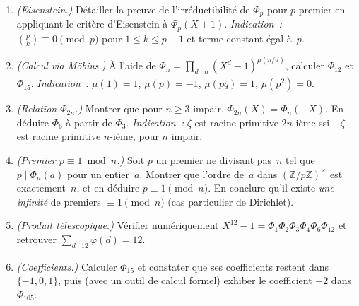 \begin{mdframed}[style=exobar]
  \begin{enumerate}
    \item \textit{(Eisenstein.)} Détailler la preuve de l'irréductibilité de
          $\Phi_p$ pour $p$ premier en appliquant le critère d'Eisenstein à
          $\Phi_p(X+1)$. \textit{Indication~:} $\binom{p}{k}\equiv 0\pmod p$
          pour $1\leq k\leq p-1$ et terme constant égal à~$p$.

    \item \textit{(Calcul via Möbius.)} À l'aide de
          $\Phi_n=\prod_{d\mid n}(X^d-1)^{\mu(n/d)}$, calculer $\Phi_{12}$ et
          $\Phi_{15}$. \textit{Indication~:} $\mu(1)=1$, $\mu(p)=-1$,
          $\mu(pq)=1$, $\mu(p^2)=0$.

    \item \textit{(Relation $\Phi_{2n}$.)} Montrer que pour $n\geq 3$ impair,
          $\Phi_{2n}(X)=\Phi_n(-X)$. En déduire $\Phi_6$ à partir de $\Phi_3$.
          \textit{Indication~:} $\zeta$ est racine primitive $2n$-ième ssi
          $-\zeta$ est racine primitive $n$-ième, pour $n$ impair.

    \item \textit{(Premier $p\equiv 1\bmod n$.)} Soit $p$ un premier ne divisant
          pas~$n$ tel que $p\mid \Phi_n(a)$ pour un entier~$a$. Montrer que
          l'ordre de~$\bar a$ dans $(\mathbb{Z}/p\mathbb{Z})^\times$ est
          exactement~$n$, et en déduire $p\equiv 1\pmod n$. En conclure qu'il
          existe \emph{une infinité} de premiers $\equiv 1\pmod n$ (cas
          particulier de Dirichlet).

    \item \textit{(Produit télescopique.)} Vérifier numériquement
          $X^{12}-1=\Phi_1\Phi_2\Phi_3\Phi_4\Phi_6\Phi_{12}$ et retrouver
          $\sum_{d\mid 12}\varphi(d)=12$.

    \item \textit{(Coefficients.)} Calculer $\Phi_{15}$ et constater que ses
          coefficients restent dans $\{-1,0,1\}$, puis (avec un outil de calcul
          formel) exhiber le coefficient $-2$ dans $\Phi_{105}$.
  \end{enumerate}
\end{mdframed}

